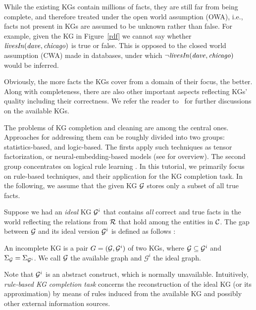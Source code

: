 While the existing KGs contain millions of facts, they are still far from being complete, and therefore treated under the open world assumption (OWA), i.e., facts not present in KGs are assumed to be unknown rather than false. For example, given the KG in Figure~\ref{rdf} we cannot say whether $\mathit{livesIn(dave,chicago)}$ is true or false. This is opposed to the closed world assumption (CWA) made in databases, under which $\mathit{\neg livesIn(dave,chicago)}$ would be inferred. %

Obviously, the more facts the KGs cover from a %
domain  of their focus, %
the better. Along with completeness, there are also other important aspects reflecting KGs' quality %
including %
their correctness.  We refer the reader to~\cite{Nickel2015ARO,DBLP:journals/semweb/Paulheim17} for further discussions on the available KGs.


The problems of KG completion and cleaning are %
among the central ones. Approaches for addressing them can be roughly divided into two groups: statistics-based, and logic-based. The firsts apply such techniques as tensor factorization, or neural-embedding-based models (see \cite{DBLP:journals/pieee/Nickel0TG16} for overview). The second group concentrates on logical rule learning \cite{ruleoverview}. In this tutorial, we primarily focus on rule-based techniques, and their application for the KG completion task. In the following, we assume that the given KG $\mathcal{G}$ stores only a subset of all true facts.

Suppose we had an \emph{ideal} KG $\mathcal{G}^i$ that contains \emph{all} correct and true facts in the world reflecting the relations from $\mathcal{R}$ that hold among the entities in $\mathcal{C}$. The gap between $\mathcal{G}$ and its ideal version $\mathcal{G}^i$ is defined as follows \cite{rdfcomp}: 

\begin{definition} An incomplete KG is a pair
    $G = (\mathcal{G}, \mathcal{G}^i)$ of two KGs, where $\mathcal{G}\subseteq \mathcal{G}^i$ and
    $\Sigma_{\mathcal{G}}=\Sigma_{\mathcal{G}^i}$. We call $\mathcal{G}$ the available
    graph and $\mathcal{G}^i$ the ideal graph.  \end{definition}
    
Note that $\mathcal{G}^i$ is an abstract construct, which is normally unavailable. Intuitively, \emph{rule-based KG completion task} concerns the reconstruction of the ideal KG (or its approximation) by means of rules induced from the available KG and possibly other external information sources.

